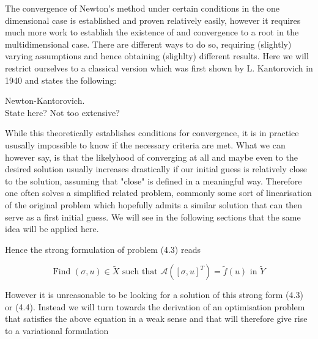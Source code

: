 \documentclass[a4paper, 11pt]{article}
\begin{document}

The convergence of Newton's method under certain conditions in the one dimensional case is established and proven relatively easily, however it requires much more work to establish the existence of and convergence to a root in the multidimensional case. There are different ways to do so, requiring (slightly) varying assumptions and hence obtaining (slighlty) different results. Here we will restrict ourselves to a classical version which was first shown by L. Kantorovich in 1940 and states the following:

\begin{Theorem}{Newton-Kantorovich.} \\
	State here? Not too extensive? 
\end{Theorem}

While this theoretically establishes conditions for convergence, it is in practice ususally impossible to know if the necessary criteria are met. What we can however say, is that the likelyhood of converging at all and maybe even to the desired solution usually increases drastically if our initial guess is relatively close to the solution, assuming that "close" is defined in a meaningful way. Therefore one often solves a simplified related problem, commonly some sort of linearisation of the original problem which hopefully admits a similar solution that can then serve as a first initial guess. We will see in the following sections that the same idea will be applied here. 



Hence the strong formulation of problem (4.3) reads  
\begin{ceqn}
	\begin{equation}
	\text{Find  } (\sigma, u) \in \tilde{X} \text{ such that } \mathcal{A}([\sigma, u]^T ) = \tilde{f}(u) \text{ in } \tilde{Y} 
	\end{equation}
\end{ceqn}
However it is unreasonable to be looking for a solution of this strong form (4.3) or (4.4). Instead we will turn towards the derivation of an optimisation problem that satisfies the above equation in a weak sense and that will therefore give rise to a variational formulation 
\end{document}
